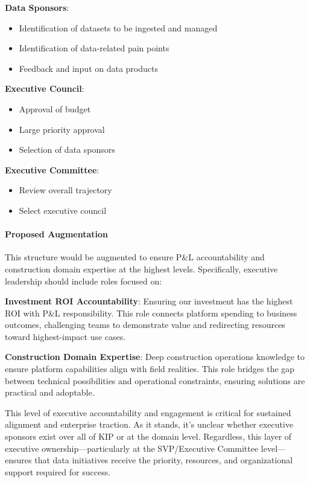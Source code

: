 \documentclass[12pt, a4paper]{article}
\begin{document}
\textbf{Data Sponsors}:
\begin{itemize}[leftmargin=*, nosep]
    \item Identification of datasets to be ingested and managed
    \item Identification of data-related pain points
    \item Feedback and input on data products
\end{itemize}

\textbf{Executive Council}:
\begin{itemize}[leftmargin=*, nosep]
    \item Approval of budget
    \item Large priority approval
    \item Selection of data sponsors
\end{itemize}

\textbf{Executive Committee}:
\begin{itemize}[leftmargin=*, nosep]
    \item Review overall trajectory
    \item Select executive council
\end{itemize}

\paragraph{Proposed Augmentation}
This structure would be augmented to ensure P\&L accountability and construction domain expertise at the highest levels. Specifically, executive leadership should include roles focused on:

\textbf{Investment ROI Accountability}: Ensuring our investment has the highest ROI with P\&L responsibility. This role connects platform spending to business outcomes, challenging teams to demonstrate value and redirecting resources toward highest-impact use cases.

\textbf{Construction Domain Expertise}: Deep construction operations knowledge to ensure platform capabilities align with field realities. This role bridges the gap between technical possibilities and operational constraints, ensuring solutions are practical and adoptable.

This level of executive accountability and engagement is critical for sustained alignment and enterprise traction. As it stands, it's unclear whether executive sponsors exist over all of KIP or at the domain level. Regardless, this layer of executive ownership—particularly at the SVP/Executive Committee level—ensures that data initiatives receive the priority, resources, and organizational support required for success.
\end{document}
